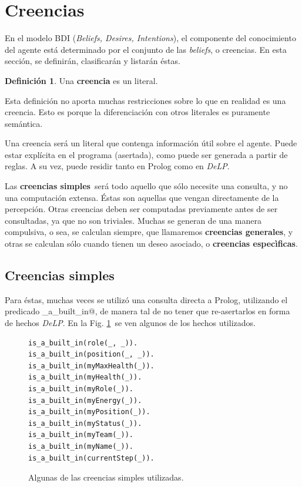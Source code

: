 \documentclass[oneside]{book}
\theoremstyle{definition}
\newtheorem{definicion}{Definición}[section]
\newcommand{\DLP}{\mbox{\textit{DeLP}}}
\begin{document}
\section{Creencias}

\label{sec:creencias}

En el modelo BDI (\textit{Beliefs, Desires, Intentions}), el componente del conocimiento
del agente está determinado por el conjunto de las \textit{beliefs}, o creencias. En esta
sección, se definirán, clasificarán y listarán éstas.

\begin{definicion}
	Una \textbf{creencia} es un literal.
\end{definicion}

Esta definición no aporta muchas restricciones sobre lo que en realidad es una creencia.
Esto es porque la diferenciación con otros literales es puramente semántica.

Una creencia será un literal que contenga información útil sobre el agente. Puede estar
explícita en el programa (asertada), como puede ser generada a partir de reglas. A su vez,
puede residir tanto en Prolog como en \DLP.

Las \textbf{creencias simples}\ será todo aquello que sólo necesite una consulta, y no
una computación extensa. Éstas son aquellas que vengan directamente de la percepción. 
Otras creencias deben ser computadas previamente antes de ser consultadas, ya que no
son triviales. Muchas se generan de una manera compulsiva, o sea, se calculan siempre,
que llamaremos \textbf{creencias generales},
y otras se calculan sólo cuando tienen un deseo asociado, o \textbf{creencias 
especìficas}.


\subsection{Creencias simples}


Para éstas, muchas veces se utilizó una consulta directa a Prolog,
utilizando el predicado \verb@is_a_built_in@, de manera tal de no tener que 
re-asertarlos en forma de hechos \DLP. En la Fig. \ref{fig:creenciasSimples}\ se ven
algunos de los hechos utilizados.

\begin{figure}
\begin{verbatim}
is_a_built_in(role(_, _)).
is_a_built_in(position(_, _)).
is_a_built_in(myMaxHealth(_)).
is_a_built_in(myHealth(_)).
is_a_built_in(myRole(_)).
is_a_built_in(myEnergy(_)).
is_a_built_in(myPosition(_)).
is_a_built_in(myStatus(_)).
is_a_built_in(myTeam(_)).
is_a_built_in(myName(_)).
is_a_built_in(currentStep(_)).
\end{verbatim}
\caption{Algunas de las creencias simples utilizadas.}
\label{fig:creenciasSimples}
\end{figure}
\end{document}
